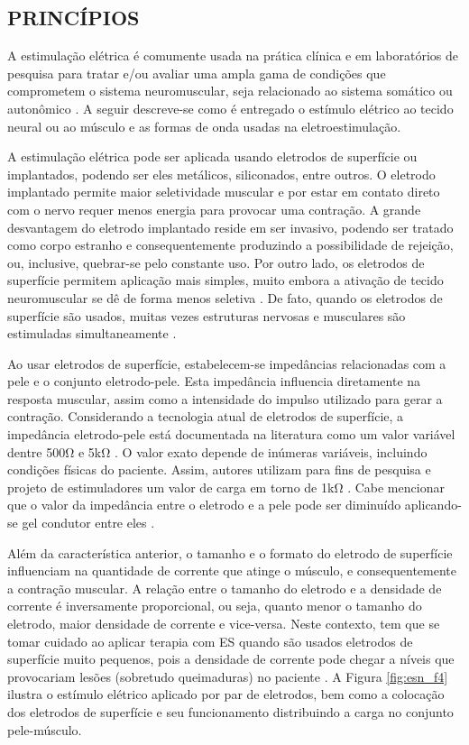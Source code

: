 \subsection{PRINCÍPIOS}

A estimulação elétrica é comumente usada na prática clínica e em laboratórios de pesquisa para tratar e/ou avaliar uma ampla gama de condições que comprometem o sistema neuromuscular, seja relacionado ao sistema somático ou autonômico \cite{Fernando2017}. A seguir descreve-se como é entregado o estímulo elétrico ao tecido neural ou ao músculo e as formas de onda usadas na eletroestimulação.

A estimulação elétrica pode ser aplicada usando eletrodos de superfície ou implantados, podendo ser eles metálicos, siliconados, entre outros. O eletrodo implantado permite maior seletividade muscular e por estar em contato direto com o nervo requer menos energia para provocar uma contração. A grande desvantagem do eletrodo implantado reside em ser invasivo, podendo ser tratado como corpo estranho e consequentemente produzindo a possibilidade de rejeição, ou, inclusive, quebrar-se pelo constante uso. Por outro lado, os eletrodos de superfície permitem aplicação mais simples, muito embora a ativação de tecido neuromuscular se dê de forma menos seletiva \cite{Popovic2001}. De fato, quando os eletrodos de superfície são usados, muitas vezes estruturas nervosas e musculares são estimuladas simultaneamente \cite{Linares2004}. 

Ao usar eletrodos de superfície, estabelecem-se impedâncias relacionadas com a pele e o conjunto eletrodo-pele. Esta impedância influencia diretamente na resposta muscular, assim como a intensidade do impulso utilizado para gerar a contração. Considerando a tecnologia atual de eletrodos de superfície, a impedância eletrodo-pele está documentada na literatura como um valor variável dentre 500$\mathrm{\Omega}$ e 5k$\mathrm{\Omega}$ \cite{Wu2002}. O valor exato depende de inúmeras variáveis, incluindo condições físicas do paciente. Assim, autores utilizam para fins de pesquisa e projeto de estimuladores um valor de carga em torno de 1k$\mathrm{\Omega}$ \cite{Zanotti2003, Maffiuletti2011}. Cabe mencionar que o valor da impedância entre o eletrodo e a pele pode ser diminuído aplicando-se gel condutor entre eles \cite{Faria2006}. 

Além da característica anterior, o tamanho e o formato do eletrodo de superfície influenciam na quantidade de corrente que atinge o músculo, e consequentemente a contração muscular. A relação entre o tamanho do eletrodo e a densidade de corrente é inversamente proporcional, ou seja, quanto menor o tamanho do eletrodo, maior densidade de corrente e vice-versa. Neste contexto, tem que se tomar cuidado ao aplicar terapia com ES quando são usados eletrodos de superfície muito pequenos, pois a densidade de corrente pode chegar a níveis que provocariam lesões (sobretudo queimaduras) no paciente \cite{Faria2006, Delitto1988a}. A Figura \ref{fig:esn_f4} ilustra o estímulo elétrico aplicado por par de eletrodos, bem como a colocação dos eletrodos de superfície e seu funcionamento distribuindo a carga no conjunto pele-músculo.

